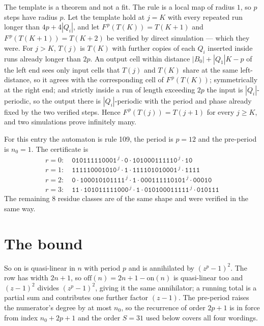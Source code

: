 \documentclass[11pt,a4paper]{article}
\theoremstyle{plain}
\theoremstyle{definition}
\begin{document}
The template is a theorem and not a fit. The rule is a local map of radius $1$, so $p$ steps
have radius $p$. Let the template hold at $j=K$ with every repeated run longer than
$4p+4|Q_i|$, and let $F^{\,p}(T(K))=T(K+1)$ and $F^{\,p}(T(K+1))=T(K+2)$ be verified by direct
simulation --- which they were. For $j>K$, $T(j)$ is $T(K)$ with further copies of each $Q_i$
inserted inside runs already longer than $2p$. An output cell within distance
$|B_0|+|Q_1|K-p$ of the left end sees only input cells that $T(j)$ and $T(K)$ share at the same
left-distance, so it agrees with the corresponding cell of $F^{\,p}(T(K))$; symmetrically at
the right end; and strictly inside a run of length exceeding $2p$ the input is
$|Q_i|$-periodic, so the output there is $|Q_i|$-periodic with the period and phase already
fixed by the two verified steps. Hence $F^{\,p}(T(j))=T(j+1)$ for every $j\ge K$, and two
simulations prove infinitely many.

For this entry the automaton is rule 109, the period is $p=12$ and the pre-period is $n_0=1$.
The certificate is
\begin{gather*}
r=0:\quad \texttt{010111110001}^{\,j} \cdot \texttt{0} \cdot \texttt{101000111110}^{\,j} \cdot \texttt{10} \\
r=1:\quad \texttt{111110001010}^{\,j} \cdot \texttt{1} \cdot \texttt{111101010001}^{\,j} \cdot \texttt{1111} \\
r=2:\quad \texttt{0} \cdot \texttt{100010101111}^{\,j} \cdot \texttt{1} \cdot \texttt{000111110101}^{\,j} \cdot \texttt{00010} \\
r=3:\quad \texttt{11} \cdot \texttt{101011111000}^{\,j} \cdot \texttt{1} \cdot \texttt{010100011111}^{\,j} \cdot \texttt{010111}
\end{gather*} The remaining 8 residue classes are of the same shape and were verified in the same way.

\section{The bound}

So $\mathrm{on}$ is quasi-linear in $n$ with period $p$ and is annihilated by
$(z^p-1)^2$. The row has width $2n+1$, so $\mathrm{off}(n)=2n+1-\mathrm{on}(n)$ is quasi-linear
too and $(z-1)^2$ divides $(z^p-1)^2$, giving it the same annihilator; a running total is a
partial sum and contributes one further factor $(z-1)$. The pre-period raises the numerator's
degree by at most $n_0$, so the recurrence of order $2p+1$ is in force from index $n_0+2p+1$
and the order $S=31$ used below covers all four wordings.
\end{document}
